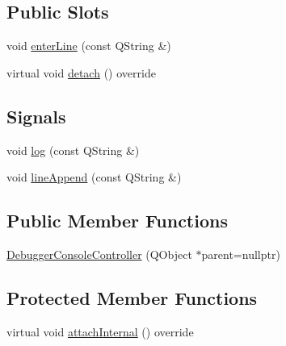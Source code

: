 \subsection*{Public Slots}
\begin{DoxyCompactItemize}
\item 
void \mbox{\hyperlink{class_q_g_b_a_1_1_debugger_console_controller_ae81d1d614b8a97913a15d7cf685bc4da}{enter\+Line}} (const Q\+String \&)
\item 
virtual void \mbox{\hyperlink{class_q_g_b_a_1_1_debugger_console_controller_a40c6e05b341d8b27aa4a615129200984}{detach}} () override
\end{DoxyCompactItemize}
\subsection*{Signals}
\begin{DoxyCompactItemize}
\item 
void \mbox{\hyperlink{class_q_g_b_a_1_1_debugger_console_controller_aa05a49c51ae87e6a2c6be925b6b9d85e}{log}} (const Q\+String \&)
\item 
void \mbox{\hyperlink{class_q_g_b_a_1_1_debugger_console_controller_a6ca6e4b087937efb5d25e5f4703e4a7f}{line\+Append}} (const Q\+String \&)
\end{DoxyCompactItemize}
\subsection*{Public Member Functions}
\begin{DoxyCompactItemize}
\item 
\mbox{\hyperlink{class_q_g_b_a_1_1_debugger_console_controller_a3158c61c1ea6f26360a08c479c9e7e7a}{Debugger\+Console\+Controller}} (Q\+Object $\ast$parent=nullptr)
\end{DoxyCompactItemize}
\subsection*{Protected Member Functions}
\begin{DoxyCompactItemize}
\item 
virtual void \mbox{\hyperlink{class_q_g_b_a_1_1_debugger_console_controller_a3a437b392ab1859c47f432e273971f9c}{attach\+Internal}} () override
\end{DoxyCompactItemize}
